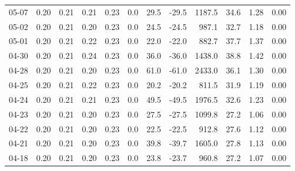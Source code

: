 \begin{threeparttable}
{\begin{tabular}{lrrrrrrrrrrr}
  05-07 &          0.20 &          0.21 &          0.21 &        0.23 &                 0.0 &                29.5 &      -29.5 &              1187.5 &             34.6 &            1.28 &                   0.00 \\
  05-02 &          0.20 &          0.21 &          0.20 &        0.23 &                 0.0 &                24.5 &      -24.5 &               987.1 &             32.7 &            1.18 &                   0.00 \\
  05-01 &          0.20 &          0.21 &          0.22 &        0.23 &                 0.0 &                22.0 &      -22.0 &               882.7 &             37.7 &            1.37 &                   0.00 \\
  04-30 &          0.20 &          0.21 &          0.24 &        0.23 &                 0.0 &                36.0 &      -36.0 &              1438.0 &             38.8 &            1.42 &                   0.00 \\
  04-28 &          0.20 &          0.21 &          0.20 &        0.23 &                 0.0 &                61.0 &      -61.0 &              2433.0 &             36.1 &            1.30 &                   0.00 \\
  04-25 &          0.20 &          0.21 &          0.22 &        0.23 &                 0.0 &                20.2 &      -20.2 &               811.5 &             31.9 &            1.19 &                   0.00 \\
  04-24 &          0.20 &          0.21 &          0.21 &        0.23 &                 0.0 &                49.5 &      -49.5 &              1976.5 &             32.6 &            1.23 &                   0.00 \\
  04-23 &          0.20 &          0.21 &          0.20 &        0.23 &                 0.0 &                27.5 &      -27.5 &              1099.8 &             27.2 &            1.06 &                   0.00 \\
  04-22 &          0.20 &          0.21 &          0.20 &        0.23 &                 0.0 &                22.5 &      -22.5 &               912.8 &             27.6 &            1.12 &                   0.00 \\
  04-21 &          0.20 &          0.21 &          0.20 &        0.23 &                 0.0 &                39.8 &      -39.7 &              1605.0 &             27.8 &            1.13 &                   0.00 \\
  04-18 &          0.20 &          0.21 &          0.20 &        0.23 &                 0.0 &                23.8 &      -23.7 &               960.8 &             27.2 &            1.07 &                   0.00 \\

\end{tabular}}
\end{threeparttable}
